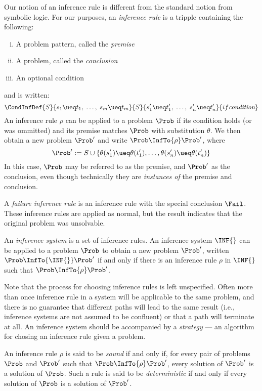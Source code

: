 Our notion of an inference rule is different from the standard notion from
symbolic logic. For our purposes, an \emph{inference rule} is a tripple
containing the following:
\begin{enumerate}[(i)]
    \item A problem pattern, called the \emph{premise}
    \item A problem, called the \emph{conclusion}
    \item An optional condition
\end{enumerate}
and is written:
\[\CondInfDef
    {S}{s_1 \ueq t_1, \; \dotsc, \; s_m \ueq t_m}
    {S}{s'_1 \ueq t'_1, \; \dotsc, \; s'_n \ueq t'_n}
    {if \textit{condition}}
\]
An inference rule $\rho$ can be applied to a problem $\Prob$ if its condition
holds (or was ommitted) and its premise matches $\Prob$ with substitution
$\theta$. We then obtain a new problem $\Prob'$ and write $\Prob \InfTo{\rho}
\Prob'$, where
\[ \Prob' := S \cup \{ \theta(s'_1) \ueq \theta(t'_1), \dotsc, \theta(s'_n)
\ueq \theta(t'_n) \} \]
In this case, $\Prob$ may be referred to as the premise, and $\Prob'$ as the
conclusion, even though technically they are \emph{instances of} the premise
and conclusion.

A \emph{failure inference rule} is an inference rule with the special
conclusion $\Fail$. These inference rules are applied as normal, but the result
indicates that the original problem was unsolvable.

An \emph{inference system} is a set of inference rules. An inference system
$\INF{}$ can be applied to a problem $\Prob$ to obtain a new problem $\Prob'$,
written $\Prob \InfTo{\INF{}} \Prob'$ if and only if there is an inference rule
$\rho$ in $\INF{}$ such that $\Prob \InfTo{\rho} \Prob'$.

Note that the process for choosing inference rules is left unspecified. Often
more than once inference rule in a system will be applicable to the same
problem, and there is no guarantee that different paths will lead to the same
result (i.e., inference systems are not assumed to be confluent) or that a path
will terminate at all. An inference system should be accompanied by a
\emph{strategy} --- an algorithm for chosing an inference rule given a problem.

An inference rule $\rho$ is said to be \emph{sound} if and only if, for every
pair of problems $\Prob$ and $\Prob'$ such that $\Prob \InfTo{\rho} \Prob'$,
every solution of $\Prob'$ is a solution of $\Prob$. Such a rule is said to be
\emph{deterministic} if and only if every solution of $\Prob$ is a solution of
$\Prob'$.

